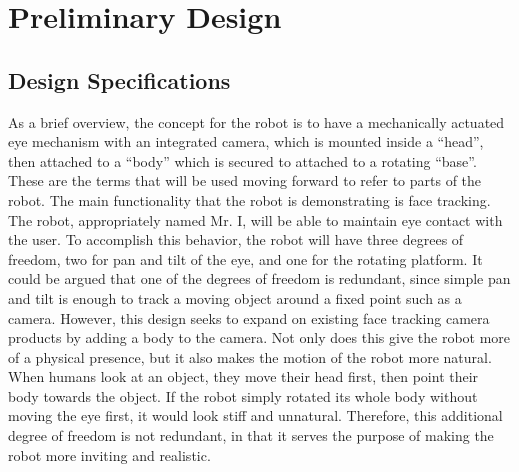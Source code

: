 \chapter{Preliminary Design}
\section{Design Specifications}
As a brief overview, the concept for the robot is to have a mechanically actuated eye mechanism with an integrated camera, which is mounted inside a ``head'', then attached to a ``body'' which is secured to attached to a rotating ``base''. These are the terms that will be used moving forward to refer to parts of the robot. The main functionality that the robot is demonstrating is face tracking. The robot, appropriately named Mr. I, will be able to maintain eye contact with the user. To accomplish this behavior, the robot will have three degrees of freedom, two for pan and tilt of the eye, and one for the rotating platform. It could be argued that one of the degrees of freedom is redundant, since simple pan and tilt is enough to track a moving object around a fixed point such as a camera. However, this design seeks to expand on existing face tracking camera products by adding a body to the camera. Not only does this give the robot more of a physical presence, but it also makes the motion of the robot more natural. When humans look at an object, they move their head first, then point their body towards the object. If the robot simply rotated its whole body without moving the eye first, it would look stiff and unnatural. Therefore, this additional degree of freedom is not redundant, in that it serves the purpose of making the robot more inviting and realistic.

